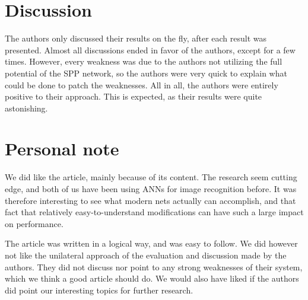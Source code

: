 \section{Discussion}
The authors only discussed their results on the fly, after each result was presented. Almost all discussions ended in favor of the authors, except for a few times. However, every weakness was due to the authors not utilizing the full potential of the SPP network, so the authors were very quick to explain what could be done to patch the weaknesses. All in all, the authors were entirely positive to their approach. This is expected, as their results were quite astonishing.


\section{Personal note}
We did like the article, mainly because of its content. The research seem cutting edge, and both of us have been using ANNs for image recognition before. It was therefore interesting to see what modern nets actually can accomplish, and that fact that relatively easy-to-understand modifications can have such a large impact on performance. 

The article was written in a logical way, and was easy to follow. We did however not like the unilateral approach of the evaluation and discussion made by the authors. They did not discuss nor point to any strong weaknesses of their system, which we think a good article should do. We would also have liked if the authors did point our interesting topics for further research. 

